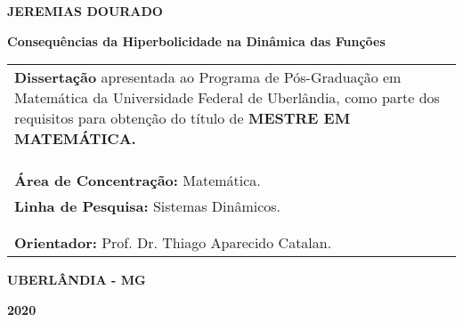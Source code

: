 %

\begin{center}
\textbf{JEREMIAS DOURADO}
\end{center}

\vspace{4.5cm}

\begin{center}
{\LARGE \textbf{Consequências da Hiperbolicidade na Dinâmica das Funções}}
\end{center}

\vspace{4.5cm}

\hfill
\begin{tabular}
[c]{p{10cm}}
\textbf{Dissertação} apresentada ao Programa de Pós-Graduação em Matemática da
Universidade Federal de Uberlândia, como parte dos requisitos para obtenção do
título de \textbf{MESTRE EM MATEMÁTICA.}\\
\\
\\
\\
\textbf{Área de Concentração:} Matemática.\\
\textbf{Linha de Pesquisa:} Sistemas Dinâmicos.\\
\\
\\
\textbf{Orientador:} Prof. Dr. Thiago Aparecido Catalan.
\end{tabular}


\vspace{3cm}

\begin{center}
\textbf{UBERLÂNDIA - MG}

\textbf{2020}

\end{center}

%

